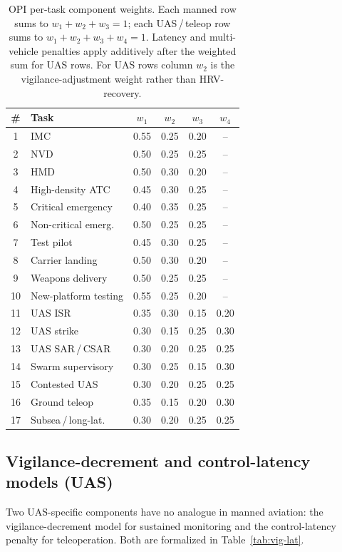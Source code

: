 \documentclass[10pt,journal,twocolumn,compsoc]{IEEEtran}
\begin{document}
\begin{table}[t]
\caption{OPI per-task component weights. Each manned row sums to $w_1{+}w_2{+}w_3=1$; each UAS\,/\,teleop row sums to $w_1{+}w_2{+}w_3{+}w_4=1$. Latency and multi-vehicle penalties apply additively after the weighted sum for UAS rows. For UAS rows column $w_2$ is the vigilance-adjustment weight rather than HRV-recovery.}
\label{tab:weights}
\centering
\renewcommand{\arraystretch}{1.05}
\setlength{\tabcolsep}{3pt}
\begin{tabular}{@{}clcccc@{}}
\toprule
\# & Task & $w_1$ & $w_2$ & $w_3$ & $w_4$ \\
\midrule
1  & IMC                  & 0.55 & 0.25 & 0.20 & --   \\
2  & NVD                  & 0.50 & 0.25 & 0.25 & --   \\
3  & HMD                  & 0.50 & 0.30 & 0.20 & --   \\
4  & High-density ATC     & 0.45 & 0.30 & 0.25 & --   \\
5  & Critical emergency   & 0.40 & 0.35 & 0.25 & --   \\
6  & Non-critical emerg.  & 0.50 & 0.25 & 0.25 & --   \\
7  & Test pilot           & 0.45 & 0.30 & 0.25 & --   \\
8  & Carrier landing      & 0.50 & 0.30 & 0.20 & --   \\
9  & Weapons delivery     & 0.50 & 0.25 & 0.25 & --   \\
10 & New-platform testing & 0.55 & 0.25 & 0.20 & --   \\
11 & UAS ISR              & 0.35 & 0.30 & 0.15 & 0.20 \\
12 & UAS strike           & 0.30 & 0.15 & 0.25 & 0.30 \\
13 & UAS SAR\,/\,CSAR     & 0.30 & 0.20 & 0.25 & 0.25 \\
14 & Swarm supervisory    & 0.30 & 0.25 & 0.15 & 0.30 \\
15 & Contested UAS        & 0.30 & 0.20 & 0.25 & 0.25 \\
16 & Ground teleop        & 0.35 & 0.15 & 0.20 & 0.30 \\
17 & Subsea\,/\,long-lat. & 0.30 & 0.20 & 0.25 & 0.25 \\
\bottomrule
\end{tabular}
\end{table}

\subsection{Vigilance-decrement and control-latency models (UAS)}
Two UAS-specific components have no analogue in manned aviation: the vigilance-decrement model for sustained monitoring and the control-latency penalty for teleoperation. Both are formalized in Table~\ref{tab:vig-lat}.
\end{document}
